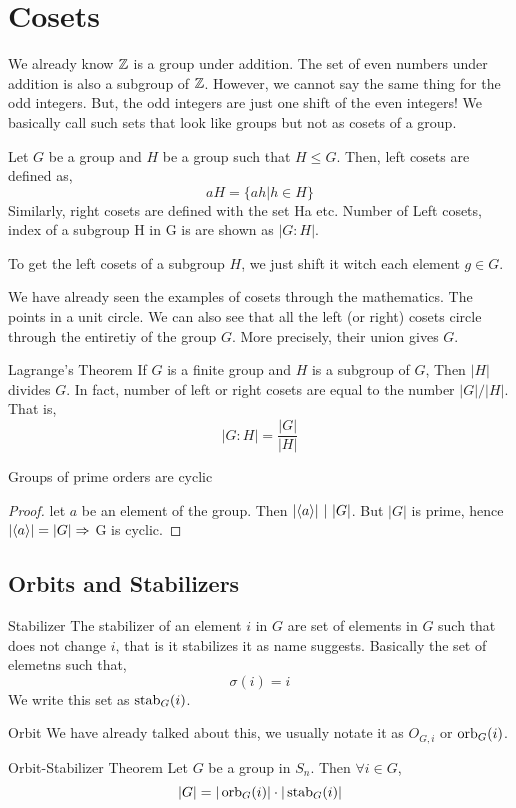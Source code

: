 \chapter{Cosets}
We already know $\mathbb Z$ is a group under addition. The set of even numbers under addition is also a subgroup of $\mathbb Z$. However, we cannot say
the same thing for the odd integers. But, the odd integers are just one shift of the even integers! We basically call such sets that look
like groups but not as \alert{cosets} of a group.
\begin{definition}
    Let $G$ be a group and $H$ be a group such that $H \le G$. Then, \alert{left cosets} are defined as,
    \[ aH = \{ ah | h \in H\}\]
    Similarly, right cosets are defined with the set Ha etc.
    Number of Left cosets, \alert{index} of  a subgroup H in G is  are shown as $|G : H|$.
\end{definition}
To get the left cosets of a subgroup $H$, we just shift it witch each element $g \in G$.

We have already seen the examples of cosets through the mathematics. The points in a unit circle. We can also see that all the left (or
right) cosets circle through the entiretiy of the group $G$. More precisely, their union gives $G$.
\begin{theorem}{Lagrange's Theorem}
    If $G$ is a finite group and $H$ is a subgroup of $G$, Then $|H|$ divides $G$. In fact, number of left or right cosets are equal to the
    number $|G| / |H|$. That is,
    \[ |G: H| = \frac{|G|}{|H|}\]
\end{theorem}
\begin{corollary}
    Groups of prime orders are cyclic
    \begin{proof}
        let $a$ be an element of the group. Then $|\langle{a} \rangle| \ | \ |G|$. But $|G|$ is prime, hence $|\langle{a} \rangle| = |G| \Rightarrow$ G is cyclic.
    \end{proof}
\end{corollary}
\section{Orbits and Stabilizers}
\begin{definition}{Stabilizer}
    The stabilizer of an element $i$ in $G$ are set of elements in $G$ such that does not change $i$, that is it \alert{stabilizes it} as
    name suggests. Basically the set of elemetns such that,
    \[ \sigma(i) = i\]
    We write this set as $\operatorname{stab}_G(i)$.
\end{definition}
\begin{definition}{Orbit}
    We have already talked about this, we usually notate it as $O_{G,i}$ or $\operatorname{orb}_G(i)$.
\end{definition}
\begin{theorem}{Orbit-Stabilizer Theorem}
    Let $G$ be a group in $S_n$. Then $\forall i \in G$,
    \[ |G| = |\operatorname{orb}_G(i)| \cdot |\operatorname{stab}_G(i)|\]
\end{theorem}
